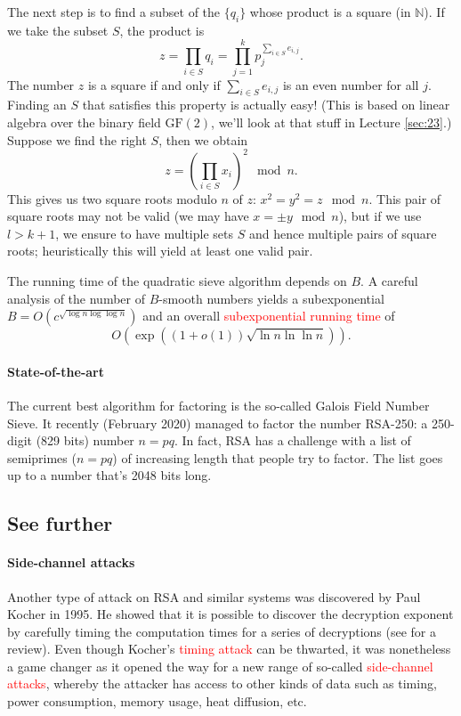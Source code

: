 \documentclass[a4paper, 11pt, openany]{book}
\numberwithin{equation}{section}
\theoremstyle{plain}
\theoremstyle{definition}
\newcommand{\GF}{\mathrm{GF}}
\newcommand{\N}{\mathbb{N}}
\newcommand{\Important}[1]{\textcolor{red}{#1}}
\begin{document}
The next step is to find a subset of the $\{q_i\}$ whose product is a square (in $\N$). If we take the subset $S$, the product is
\[
    z = \prod_{i \in S} q_i = \prod_{j=1}^k p_j^{\sum_{i \in S} e_{i,j}}.
\]
The number $z$ is a square if and only if $\sum_{i \in S} e_{i,j}$ is an even number for all $j$. Finding an $S$ that satisfies this property is actually easy! (This is based on linear algebra over the binary field $\GF(2)$, we'll look at that stuff in Lecture \ref{sec:23}.) Suppose we find the right $S$, then we obtain
\[
    z = \left( \prod_{i \in S} x_i  \right)^2 \mod n.
\]
This gives us two square roots modulo $n$ of $z$: $x^2 = y^2 = z \mod n$. This pair of square roots may not be valid (we may have $x = \pm y \mod n$), but if we use $l > k+1$, we ensure to have multiple sets $S$ and hence multiple pairs of square roots; heuristically this will yield at least one valid pair.

The running time of the quadratic sieve algorithm depends on $B$. A careful analysis of the number of $B$-smooth numbers yields a subexponential $B = O(c^{\sqrt{\log n \log \log n}})$ and an overall \Important{subexponential running time} of
\[
    O\left( \exp( (1 + o(1)) \sqrt{ \ln n \ln \ln n } ) \right).
\]

\paragraph{State-of-the-art}
The current best algorithm for factoring is the so-called Galois Field Number Sieve. It recently (February 2020) managed to factor the number RSA-250: a 250-digit (829 bits) number $n=pq$. In fact, RSA has a challenge with a list of semiprimes ($n= pq$) of increasing length that people try to factor. The list goes up to a number that's 2048 bits long.


\subsection{See further}

\paragraph{Side-channel attacks}
Another type of attack on RSA and similar systems was discovered by Paul Kocher in 1995. He showed that it is possible to discover the decryption exponent by carefully timing the computation times for a series of decryptions (see \cite[Section 6.2]{TW02} for a review). Even though Kocher's \Important{timing attack} can be thwarted, it was nonetheless a game changer as it opened the way for a new range of so-called \Important{side-channel attacks}, whereby the attacker has access to other kinds of data such as timing, power consumption, memory usage, heat diffusion, etc.
\end{document}
